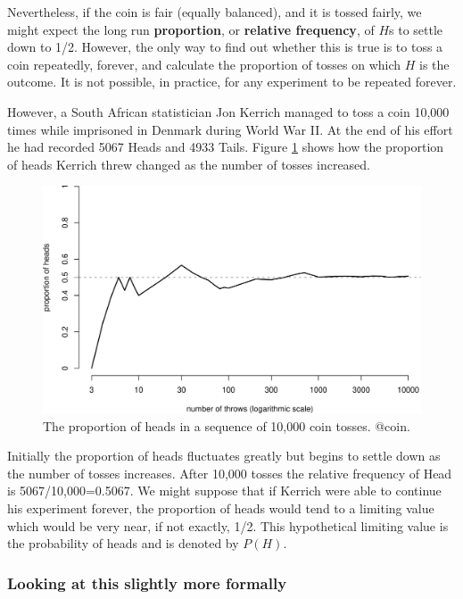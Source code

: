 \documentclass[
  11pt,
  british,
  openany, a4paper]{book}
\begin{document}
Nevertheless, if the coin is fair (equally balanced), and it is tossed fairly, we might expect the long run \textbf{proportion}, or \textbf{relative frequency}, of \(H\)s to settle down to 1/2. However, the only way to find out whether this is true is to toss a coin repeatedly, forever, and calculate the proportion of tosses on which \(H\) is the outcome. It is not possible, in practice, for any experiment to be repeated forever.

However, a South African statistician Jon Kerrich managed to toss a coin
10,000 times while imprisoned in Denmark during World War II. At the end of his
effort he had recorded 5067 Heads and 4933 Tails. Figure \ref{fig:coin} shows
how the proportion of heads Kerrich threw changed as the number of tosses increased.

\begin{figure}

{\centering \includegraphics[width=0.75\linewidth]{images/coin} 

}

\caption{The proportion of heads in a sequence of 10,000 coin tosses. @coin.}\label{fig:coin}
\end{figure}

Initially the proportion of heads fluctuates greatly but begins to settle down as the number of tosses increases. After 10,000 tosses the relative frequency of Head is 5067/10,000=0.5067. We might suppose that if Kerrich were able to continue his experiment forever, the proportion of heads would tend to a limiting value which would be very near, if not exactly, 1/2. This hypothetical limiting value is the probability of heads and is denoted by \(P(H)\).

\hypertarget{looking-at-this-slightly-more-formally}{%
\subsubsection*{Looking at this slightly more formally}\label{looking-at-this-slightly-more-formally}}
\end{document}
